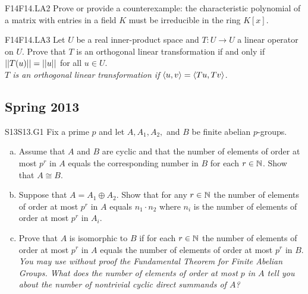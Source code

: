 \documentclass[../AlgebraQualSolutions.tex]{subfiles}
\begin{document}
\begin{prob}{F14}{F14.LA2}
	Prove or provide a counterexample: the characteristic polynomial of a matrix with entries in a field $K$ must be irreducible in the ring $K[x]$.
\end{prob}

\begin{prob}{F14}{F14.LA3}
	Let $U$ be a real inner-product space and $T: U \to U$ a linear operator on $U$. Prove that $T$ is an orthogonal linear transformation if and only if $\norm[T(u)] = \norm[u]$ for all $u \in U$.\\

	\emph{$T$ is an orthogonal linear transformation if $\ip{u}{v} = \ip{Tu}{Tv}$}.
\end{prob}




\subsection{Spring 2013}

\begin{prob}{S13}{S13.G1}
	Fix a prime $p$ and let $A, A_1, A_2,$ and $B$ be finite abelian $p$-groups.

	\begin{enumerate}[(a)]
		\item Assume that $A$ and $B$ are cyclic and that the number of elements of order at most $p^r$ in $A$ equals the corresponding number in $B$ for each $r \in \N$. Show that $A \cong B$.
		\item Suppose that $A = A_1 \oplus A_2$. Show that for any $r \in \N$ the number of elements of order at most $p^r$ in $A$ equals $n_1\cdot n_2$ where $n_i$ is the number of elements of order at most $p^r$ in $A_i$.
		\item Prove that $A$ is isomorphic to $B$ if for each $r\in \N$ the number of elements of order at most $p^r$ in $A$ equals the number of elements of order at most $p^r$ in $B$. \emph{You may use without proof the Fundamental Theorem for Finite Abelian Groups. What does the number of elements of order at most $p$ in $A$ tell you about the number of nontrivial cyclic direct summands of $A$?}
	\end{enumerate}
\end{prob}
\end{document}

